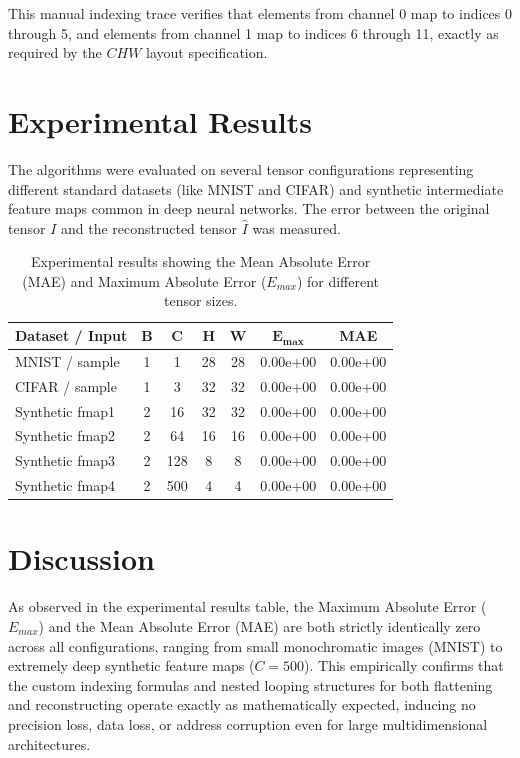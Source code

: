 \documentclass[12pt]{article}
\begin{document}
This manual indexing trace verifies that elements from channel 0 map to indices 0 through 5, and elements from channel 1 map to indices 6 through 11, exactly as required by the $CHW$ layout specification.

\section{Experimental Results}
The algorithms were evaluated on several tensor configurations representing different standard datasets (like MNIST and CIFAR) and synthetic intermediate feature maps common in deep neural networks. The error between the original tensor $I$ and the reconstructed tensor $\hat{I}$ was measured.

\begin{table}[h!]
    \centering
    \begin{tabular}{@{}lcccccc@{}}
    \toprule
    \textbf{Dataset / Input} & \textbf{B} & \textbf{C} & \textbf{H} & \textbf{W} & $\mathbf{E_{max}}$ & \textbf{MAE} \\ \midrule
    MNIST / sample           & 1 & 1   & 28 & 28 & 0.00e+00 & 0.00e+00 \\
    CIFAR / sample           & 1 & 3   & 32 & 32 & 0.00e+00 & 0.00e+00 \\
    Synthetic fmap1          & 2 & 16  & 32 & 32 & 0.00e+00 & 0.00e+00 \\
    Synthetic fmap2          & 2 & 64  & 16 & 16 & 0.00e+00 & 0.00e+00 \\
    Synthetic fmap3          & 2 & 128 & 8  & 8  & 0.00e+00 & 0.00e+00 \\
    Synthetic fmap4          & 2 & 500 & 4  & 4  & 0.00e+00 & 0.00e+00 \\ \bottomrule
    \end{tabular}
    \caption{Experimental results showing the Mean Absolute Error (MAE) and Maximum Absolute Error ($E_{max}$) for different tensor sizes.}
\end{table}

\section{Discussion}
As observed in the experimental results table, the Maximum Absolute Error ($E_{max}$) and the Mean Absolute Error (MAE) are both strictly identically zero across all configurations, ranging from small monochromatic images (MNIST) to extremely deep synthetic feature maps ($C=500$). This empirically confirms that the custom indexing formulas and nested looping structures for both flattening and reconstructing operate exactly as mathematically expected, inducing no precision loss, data loss, or address corruption even for large multidimensional architectures. 
\end{document}
